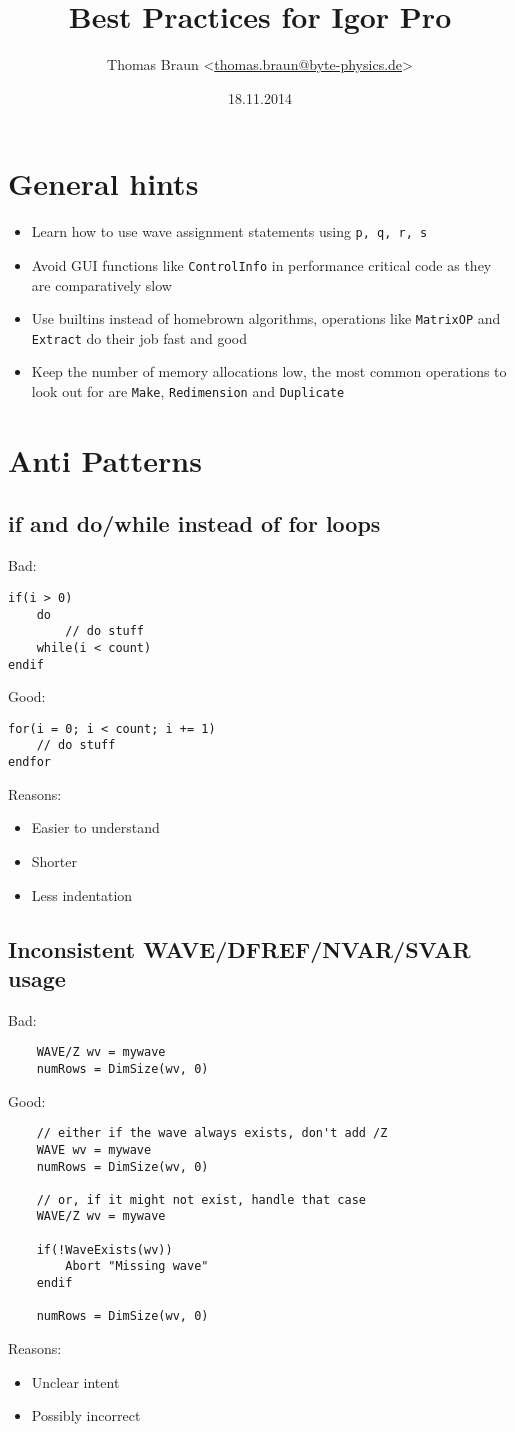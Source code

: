 \documentclass{scrartcl}
\date{18.11.2014}
\author{Thomas Braun <\url{thomas.braun@byte-physics.de}>}
\title{Best Practices for Igor Pro}
\begin{document}
%
\maketitle
%
\section{General hints}
\begin{itemize}
	\item Learn how to use wave assignment statements using \texttt{p, q, r, s}
	\item Avoid GUI functions like \texttt{ControlInfo} in performance critical code as they are comparatively slow
	\item Use builtins instead of homebrown algorithms, operations like \texttt{MatrixOP} and \texttt{Extract} do their job fast and good
	\item Keep the number of memory allocations low, the most common operations to look out for are \texttt{Make}, \texttt{Redimension} and \texttt{Duplicate}
\end{itemize}
%
\section{Anti Patterns}
%
\subsection{if and do/while instead of for loops}
Bad:
\begin{verbatim}
if(i > 0)
	do
		// do stuff
	while(i < count)
endif
\end{verbatim}
Good:
\begin{verbatim}
for(i = 0; i < count; i += 1)
	// do stuff
endfor
\end{verbatim}
Reasons:
\begin{itemize}
	\item Easier to understand
	\item Shorter
	\item Less indentation
\end{itemize}
%
\subsection{Inconsistent WAVE/DFREF/NVAR/SVAR usage}
Bad:
\begin{verbatim}
	WAVE/Z wv = mywave
	numRows = DimSize(wv, 0)
\end{verbatim}
Good:
\begin{verbatim}
	// either if the wave always exists, don't add /Z
	WAVE wv = mywave
	numRows = DimSize(wv, 0)

	// or, if it might not exist, handle that case
	WAVE/Z wv = mywave

	if(!WaveExists(wv))
		Abort "Missing wave"
	endif

	numRows = DimSize(wv, 0)
\end{verbatim}
Reasons:
\begin{itemize}
	\item Unclear intent
	\item Possibly incorrect
\end{itemize}
%
\end{document}
